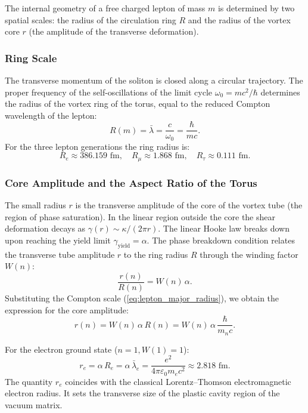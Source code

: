\documentclass[11pt,a4paper]{article}
\providecommand{\lambdabar}{\bar{\lambda}}
\theoremstyle{definition}
\theoremstyle{remark}
\begin{document}
The internal geometry of a free charged lepton of mass $m$ is determined by two spatial scales: the radius of the circulation ring $R$ and the radius of the vortex core $r$ (the amplitude of the transverse deformation).
	
\subsubsection{Ring Scale}
The transverse momentum of the soliton is closed along a circular trajectory. The proper frequency of the self-oscillations of the limit cycle $\omega_0 = m c^2 / \hbar$ determines the radius of the vortex ring of the torus, equal to the reduced Compton wavelength of the lepton:
\begin{equation}
R(m) = \lambdabar = \frac{c}{\omega_0} = \frac{\hbar}{m c}.
\label{eq:lepton_major_radius}
\end{equation}
For the three lepton generations the ring radius is:
\begin{equation}
	R_e \approx 386.159\text{ fm}, \quad R_\mu \approx 1.868\text{ fm}, \quad R_\tau \approx 0.111\text{ fm}.
	\label{eq:lepton_radii_numerical}
\end{equation}
	
\subsubsection{Core Amplitude and the Aspect Ratio of the Torus}
The small radius $r$ is the transverse amplitude of the core of the vortex tube (the region of phase saturation).
In the linear region outside the core the shear deformation decays as $\gamma(r) \sim \kappa / (2\pi r)$. The linear Hooke law breaks down upon reaching the yield limit $\gamma_{\mathrm{yield}} = \alpha$. The phase breakdown condition relates the transverse tube amplitude $r$ to the ring radius $R$ through the winding factor $W(n)$:
\begin{equation}
	\frac{r(n)}{R(n)} = W(n) \, \alpha.
\label{eq:lepton_aspect_ratio}
\end{equation}
Substituting the Compton scale (\ref{eq:lepton_major_radius}), we obtain the expression for the core amplitude:
\begin{equation}
	r(n) = W(n) \, \alpha \, R(n) = W(n) \, \alpha \, \frac{\hbar}{m_n c}.
\label{eq:core_amplitude_exact}
\end{equation}
	
For the electron ground state ($n=1, W(1)=1$):
\begin{equation}
	r_e = \alpha \, R_e = \alpha \, \lambdabar_e = \frac{e^2}{4\pi\varepsilon_0 m_e c^2} \approx 2.818\text{ fm}.
	\label{eq:classical_electron_radius}
\end{equation}
	The quantity $r_e$ coincides with the classical Lorentz--Thomson electromagnetic electron radius. It sets the transverse size of the plastic cavity region of the vacuum matrix.
	
\end{document}
